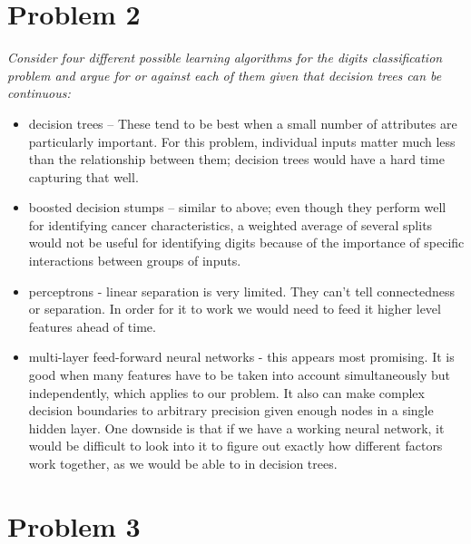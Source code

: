 \documentclass{article}
\begin{document}
  \section*{Problem 2}
  \textit{Consider four different possible learning algorithms for the
    digits classification problem and argue for or against each of
    them given that decision trees can be continuous:}
  \begin{itemize}
  \item decision trees -- These tend to be best when a small number of
    attributes are particularly important. For this problem,
    individual inputs matter much less than the relationship between
    them; decision trees would have a hard time capturing that well.
  \item boosted decision stumps -- similar to above; even though they
    perform well for identifying cancer characteristics, a weighted
    average of several splits would not be useful for identifying
    digits because of the importance of specific interactions between
    groups of inputs.
  \item perceptrons - linear separation is very limited. They can't
    tell connectedness or separation. In order for it to work we would
    need to feed it higher level features ahead of time.

  \item multi-layer feed-forward neural networks - this appears most
    promising.  It is good when many features have to be taken into
    account simultaneously but independently, which applies to our
    problem. It also can make complex decision boundaries to arbitrary
    precision given enough nodes in a single hidden layer. One
    downside is that if we have a working neural network, it would be
    difficult to look into it to figure out exactly how different
    factors work together, as we would be able to in decision trees.
  \end{itemize}

  \section*{Problem 3}
\end{document}
